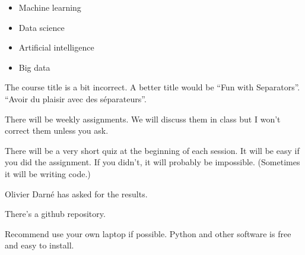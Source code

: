 




\begin{itemize}
\item Machine learning
\item Data science
\item Artificial intelligence
\item Big data
\end{itemize}

The course title is a bit incorrect.  A better title would be ``Fun with Separators''.\\
``Avoir du plaisir avec des séparateurs''.

There will be weekly assignments.  We will discuss them in class but I
won't correct them unless you ask.

There will be a very short quiz at the beginning of each session.  It
will be easy if you did the assignment.  If you didn't, it will
probably be impossible.  (Sometimes it will be writing code.)

Olivier Darné has asked for the results.

\bigskip

There's a github repository.

Recommend use your own laptop if possible.  Python and other software
is free and easy to install.


